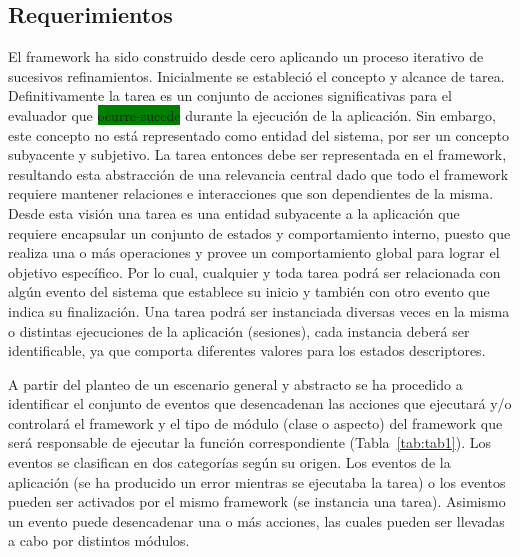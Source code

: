 \subsection{Requerimientos}
\label{subsec:requerimientos}
El framework ha sido construido desde cero aplicando un proceso iterativo de sucesivos refinamientos. Inicialmente se estableció el concepto y alcance de tarea. Definitivamente la tarea es un conjunto de acciones significativas para el evaluador que \colorbox{green}{ocurre-sucede} durante la ejecución de la aplicación. Sin embargo, este concepto no está representado como entidad del sistema, por ser un concepto subyacente y subjetivo. La tarea entonces debe ser representada en el framework, resultando esta abstracción de una relevancia central dado que todo el framework requiere mantener relaciones e interacciones que son dependientes de la misma. Desde esta visión una  tarea es una entidad subyacente a la aplicación que requiere encapsular un conjunto de estados y comportamiento interno,  puesto que realiza una o más operaciones y provee un comportamiento global para lograr el objetivo específico. Por lo cual, cualquier y toda tarea podrá ser relacionada con algún evento del sistema que establece su inicio y también con otro evento que indica su finalización. Una tarea podrá ser instanciada diversas veces en la misma o distintas ejecuciones de la aplicación (sesiones), cada instancia deberá ser identificable, ya que comporta diferentes valores para los estados descriptores. 

A partir del planteo de un escenario general y abstracto se ha procedido a identificar el conjunto de eventos que desencadenan las acciones que ejecutará y/o controlará el framework y el tipo de módulo (clase o aspecto) del framework que será responsable de ejecutar la función correspondiente (Tabla~\ref{tab:tab1}).  Los  eventos se clasifican en dos categorías según su origen. Los eventos de la aplicación (se ha producido un error mientras se ejecutaba la tarea) o los eventos pueden ser activados  por el mismo framework (se instancia una tarea). Asimismo un evento puede desencadenar una o más acciones, las cuales pueden ser llevadas a cabo por distintos módulos. 

